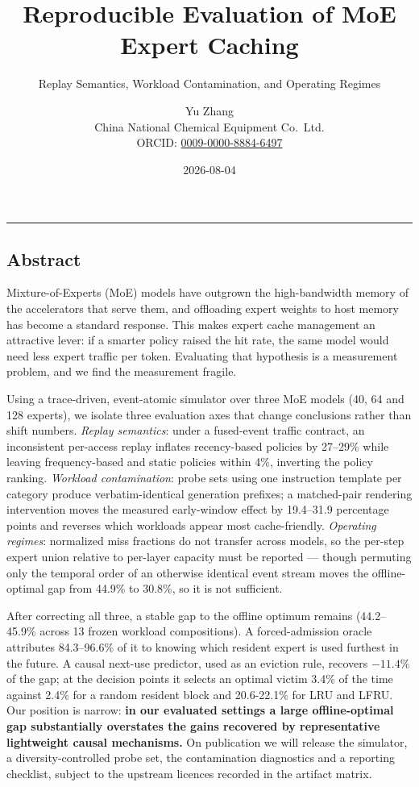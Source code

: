 \documentclass[
  10pt,
  letterpaper,
  10pt]{article}
\title{Reproducible Evaluation of MoE Expert Caching}
\subtitle{Replay Semantics, Workload Contamination, and Operating
Regimes}
\author{Yu Zhang \orcidlink{0009-0000-8884-6497}\\
China National Chemical Equipment Co.~Ltd.\\
ORCID:
\href{https://orcid.org/0009-0000-8884-6497}{0009-0000-8884-6497}}
\date{2026-08-04}
\begin{document}
\maketitle

\begin{center}\rule{0.5\linewidth}{0.5pt}\end{center}

\subsection{Abstract}\label{abstract}

Mixture-of-Experts (MoE) models have outgrown the high-bandwidth memory
of the accelerators that serve them, and offloading expert weights to
host memory has become a standard response. This makes expert cache
management an attractive lever: if a smarter policy raised the hit rate,
the same model would need less expert traffic per token. Evaluating that
hypothesis is a measurement problem, and we find the measurement
fragile.

Using a trace-driven, event-atomic simulator over three MoE models (40,
64 and 128 experts), we isolate three evaluation axes that change
conclusions rather than shift numbers. \emph{Replay semantics}: under a
fused-event traffic contract, an inconsistent per-access replay inflates
recency-based policies by 27--29\% while leaving frequency-based and
static policies within 4\%, inverting the policy ranking. \emph{Workload
contamination}: probe sets using one instruction template per category
produce verbatim-identical generation prefixes; a matched-pair rendering
intervention moves the measured early-window effect by 19.4--31.9
percentage points and reverses which workloads appear most
cache-friendly. \emph{Operating regimes}: normalized miss fractions do
not transfer across models, so the per-step expert union relative to
per-layer capacity must be reported --- though permuting only the
temporal order of an otherwise identical event stream moves the
offline-optimal gap from 44.9\% to 30.8\%, so it is not sufficient.

After correcting all three, a stable gap to the offline optimum remains
(44.2--45.9\% across 13 frozen workload compositions). A
forced-admission oracle attributes 84.3--96.6\% of it to knowing which
resident expert is used furthest in the future. A causal next-use
predictor, used as an eviction rule, recovers \(-11.4\)\% of the gap; at
the decision points it selects an optimal victim 3.4\% of the time
against 2.4\% for a random resident block and 20.6-22.1\% for LRU and
LFRU. Our position is narrow: \textbf{in our evaluated settings a large
offline-optimal gap substantially overstates the gains recovered by
representative lightweight causal mechanisms.} On publication we will
release the simulator, a diversity-controlled probe set, the
contamination diagnostics and a reporting checklist, subject to the
upstream licences recorded in the artifact matrix.
\end{document}
